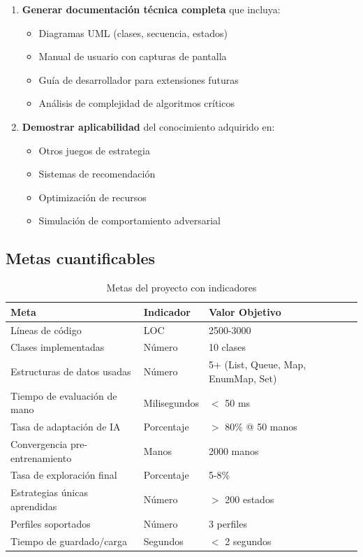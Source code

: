 \documentclass[12pt,a4paper]{article}
\begin{document}
\begin{enumerate}
    \item \textbf{Generar documentación técnica completa} que incluya:
    \begin{itemize}
        \item Diagramas UML (clases, secuencia, estados)
        \item Manual de usuario con capturas de pantalla
        \item Guía de desarrollador para extensiones futuras
        \item Análisis de complejidad de algoritmos críticos
    \end{itemize}
    
    \item \textbf{Demostrar aplicabilidad} del conocimiento adquirido en:
    \begin{itemize}
        \item Otros juegos de estrategia
        \item Sistemas de recomendación
        \item Optimización de recursos
        \item Simulación de comportamiento adversarial
    \end{itemize}
\end{enumerate}

\subsection{Metas cuantificables}

\begin{table}[H]
\centering
\caption{Metas del proyecto con indicadores}
\begin{tabular}{|p{6cm}|p{3cm}|p{5cm}|}
\hline
\textbf{Meta} & \textbf{Indicador} & \textbf{Valor Objetivo} \\
\hline
Líneas de código & LOC & 2500-3000 \\
\hline
Clases implementadas & Número & 10 clases \\
\hline
Estructuras de datos usadas & Número & 5+ (List, Queue, Map, EnumMap, Set) \\
\hline
Tiempo de evaluación de mano & Milisegundos & $<$ 50 ms \\
\hline
Tasa de adaptación de IA & Porcentaje & $>$ 80\% @ 50 manos \\
\hline
Convergencia pre-entrenamiento & Manos & 2000 manos \\
\hline
Tasa de exploración final & Porcentaje & 5-8\% \\
\hline
Estrategias únicas aprendidas & Número & $>$ 200 estados \\
\hline
Perfiles soportados & Número & 3 perfiles \\
\hline
Tiempo de guardado/carga & Segundos & $<$ 2 segundos \\
\hline
\end{tabular}
\label{tab:metas}
\end{table}
\end{document}

